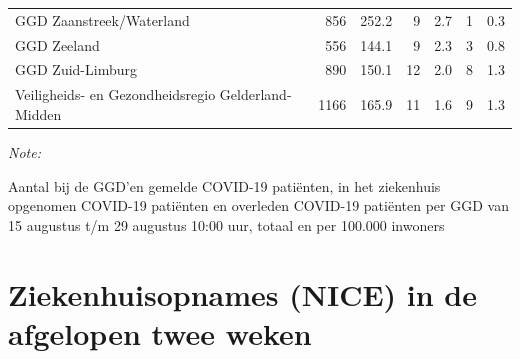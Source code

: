 \documentclass[
  english,
  man,floatsintext]{apa6}
\begin{document}
\begin{table}
\begin{threeparttable}
\begin{tabular}{lrrrrrr}
GGD Zaanstreek/Waterland & 856 & 252.2 & 9 & 2.7 & 1 & 0.3\\
GGD Zeeland & 556 & 144.1 & 9 & 2.3 & 3 & 0.8\\
GGD Zuid-Limburg & 890 & 150.1 & 12 & 2.0 & 8 & 1.3\\
Veiligheids- en Gezondheidsregio Gelderland-Midden & 1166 & 165.9 & 11 & 1.6 & 9 & 1.3\\
\bottomrule
\end{tabular}
\begin{tablenotes}
\item \textit{Note: } 
\item Aantal bij de GGD’en gemelde COVID-19 patiënten, in het ziekenhuis opgenomen COVID-19 patiënten en overleden COVID-19 patiënten per GGD van 15 augustus t/m 29 augustus 10:00 uur, totaal en per 100.000 inwoners
\end{tablenotes}
\end{threeparttable}
\endgroup{}
\end{table}

\newpage

\hypertarget{ziekenhuisopnames-nice-in-de-afgelopen-twee-weken}{%
\section{Ziekenhuisopnames (NICE) in de afgelopen twee weken}\label{ziekenhuisopnames-nice-in-de-afgelopen-twee-weken}}
\end{document}
